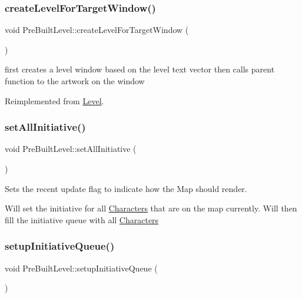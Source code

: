\subsubsection{\texorpdfstring{create\+Level\+For\+Target\+Window()}{createLevelForTargetWindow()}}
{\footnotesize\ttfamily void Pre\+Built\+Level\+::create\+Level\+For\+Target\+Window (\begin{DoxyParamCaption}{ }\end{DoxyParamCaption})\hspace{0.3cm}{\ttfamily [virtual]}}

first creates a level window based on the level text vector then calls parent function to the artwork on the window 

Reimplemented from \hyperlink{class_level_abe1e2e7c89fef892c4620d1a41e5ac22}{Level}.

\hypertarget{class_pre_built_level_a4e56751cdcbf9eeb4e093a0b7b9ca53b}{}\label{class_pre_built_level_a4e56751cdcbf9eeb4e093a0b7b9ca53b} 
\subsubsection{\texorpdfstring{set\+All\+Initiative()}{setAllInitiative()}}
{\footnotesize\ttfamily void Pre\+Built\+Level\+::set\+All\+Initiative (\begin{DoxyParamCaption}{ }\end{DoxyParamCaption})}



Sets the recent update flag to indicate how the Map should render. 

Will set the initiative for all \hyperlink{class_characters}{Characters} that are on the map currently. Will then fill the initiative queue with all \hyperlink{class_characters}{Characters} \hypertarget{class_pre_built_level_a50d13df8b51ee7aee339aa6f2007940e}{}\label{class_pre_built_level_a50d13df8b51ee7aee339aa6f2007940e} 
\subsubsection{\texorpdfstring{setup\+Initiative\+Queue()}{setupInitiativeQueue()}}
{\footnotesize\ttfamily void Pre\+Built\+Level\+::setup\+Initiative\+Queue (\begin{DoxyParamCaption}{ }\end{DoxyParamCaption})}


